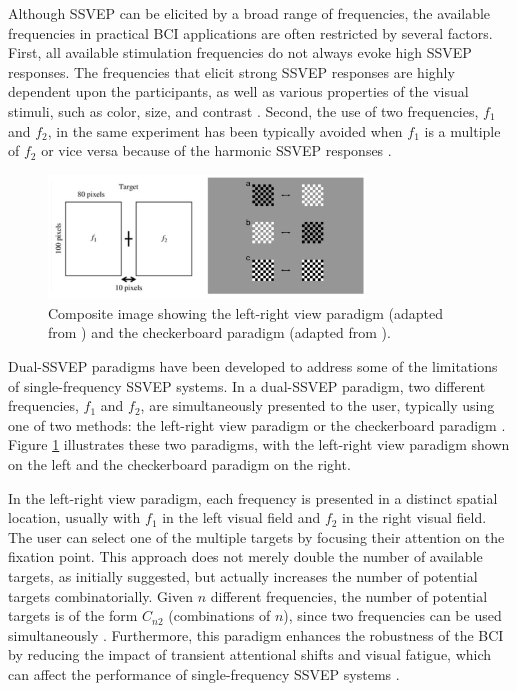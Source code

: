 Although SSVEP can be elicited by a broad range of frequencies, the available frequencies in practical BCI applications are often restricted by several factors. First, all available stimulation frequencies do not always evoke high SSVEP responses. The frequencies that elicit strong SSVEP responses are highly dependent upon the participants, as well as various properties of the visual stimuli, such as color, size, and contrast \cite{zhu2010survey}. Second, the use of two frequencies, $f_1$ and $f_2$, in the same experiment has been typically avoided when $f_1$ is a multiple of $f_2$ or vice versa because of the harmonic SSVEP responses \cite{cheng2002design,shyu2010development,wang2017benchmark}.
\begin{figure}
    \centering
    \includegraphics[width=0.75\textwidth]{images/intro/dual.png}
    \caption{Composite image showing the left-right view paradigm (adapted from \cite{yan2011right}) and the checkerboard paradigm (adapted from \cite{hwang2013new}).}
    \label{fig:dual}
\end{figure}
Dual-SSVEP paradigms have been developed to address some of the limitations of single-frequency SSVEP systems. In a dual-SSVEP paradigm, two different frequencies, $f_1$ and $f_2$, are simultaneously presented to the user, typically using one of two methods: the left-right view paradigm or the checkerboard paradigm \cite{vialatte2010steadystate,mullerputz2008control}. Figure \ref{fig:dual} illustrates these two paradigms, with the left-right view paradigm shown on the left and the checkerboard paradigm on the right.

In the left-right view paradigm, each frequency is presented in a distinct spatial location, usually with $f_1$ in the left visual field and $f_2$ in the right visual field. The user can select one of the multiple targets by focusing their attention on the fixation point. This approach does not merely double the number of available targets, as initially suggested, but actually increases the number of potential targets combinatorially. Given $n$ different frequencies, the number of potential targets is of the form $C_{n2}$ (combinations of $n$), since two frequencies can be used simultaneously \cite{mullerputz2008control,zhang2015toward,min2014neuroimaging,friman2009spelling}. Furthermore, this paradigm enhances the robustness of the BCI by reducing the impact of transient attentional shifts and visual fatigue, which can affect the performance of single-frequency SSVEP systems \cite{mullerputz2008control,zhang2015toward,min2014neuroimaging,lin2007frequency}.

